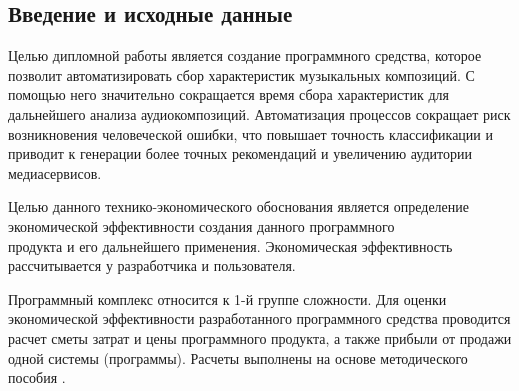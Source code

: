 \subsection{Введение и исходные данные}
\label{sec:economics:introduction}

Целью дипломной работы является создание программного средства, которое позволит автоматизировать сбор характеристик музыкальных композиций. С помощью него значительно сокращается время сбора характеристик для дальнейшего анализа аудиокомпозиций. Автоматизация процессов сокращает риск возникновения человеческой ошибки, что повышает точность классификации и приводит к генерации более точных рекомендаций и увеличению аудитории медиасервисов.

Целью данного технико-экономического обоснования является определение экономической эффективности создания данного программного \\продукта и его дальнейшего применения. Экономическая эффективность \\рассчитывается у разработчика и пользователя.

Программный комплекс относится к 1-й группе сложности. Для оценки экономической эффективности разработанного программного средства проводится расчет сметы затрат и цены программного продукта, а также прибыли от продажи одной системы (программы). Расчеты выполнены на основе методического пособия \cite{palitsyn}.
